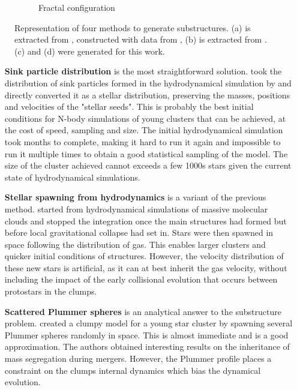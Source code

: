 \begin{figure}
\begin{subfigure}[b]{0.48\textwidth}
        \caption{Fractal configuration}
        \label{Fig:0_substructure_3}
    \end{subfigure}
\caption[Representation of four methods to generate substructures]{Representation of four methods to generate substructures. (a) is extracted from \cite{Kruijssen2012}, constructed with data from \cite{Bonnell2003}, (b) is extracted from \cite{Fujii2015}. (c) and (d) were generated for this work.}
\label{Fig:0_substructures}
\end{figure}

 
\begin{itemize}
\item[\textbf{Sink particle distribution}] is the most straightforward solution. \cite{Moeckel2010} took the distribution of sink particles formed in the hydrodynamical simulation by \cite{Bate2009} and directly converted it as a stellar distribution, preserving the masses, positions and velocities of the "stellar seeds". This is probably the best initial conditions for N-body simulations of young clusters that can be achieved, at the cost of speed, sampling and size. The initial hydrodynamical simulation took months to complete, making it hard to run it again and impossible to run it multiple times to obtain a good statistical sampling of the model. The size of the cluster achieved cannot exceeds a few 1000s stars given the current state of hydrodynamical simulations.

\item[\textbf{Stellar spawning from hydrodynamics}] is a variant of the previous method. \cite{Fujii2016} started from hydrodynamical simulations of massive molecular clouds and stopped the integration once the main structures had formed but before local gravitational collapse had set in. Stars were then spawned in space following the distribution of gas. This enables larger clusters and quicker initial conditions of structures. However, the velocity distribution of these new stars is artificial, as it can at best inherit the gas velocity, without including the impact of the early collisional evolution that occurs between protostars in the clumps.

\item[\textbf{Scattered Plummer spheres}] is an analytical answer to the substructure problem. \cite{McMillan2007} created a clumpy model for a young star cluster by spawning several Plummer spheres randomly in space. This is almost immediate and is a good approximation. The authors obtained interesting results on the inheritance of mass segregation during mergers. However, the Plummer profile places a constraint on the clumps internal dynamics which bias the dynamical evolution. 


\end{itemize}
